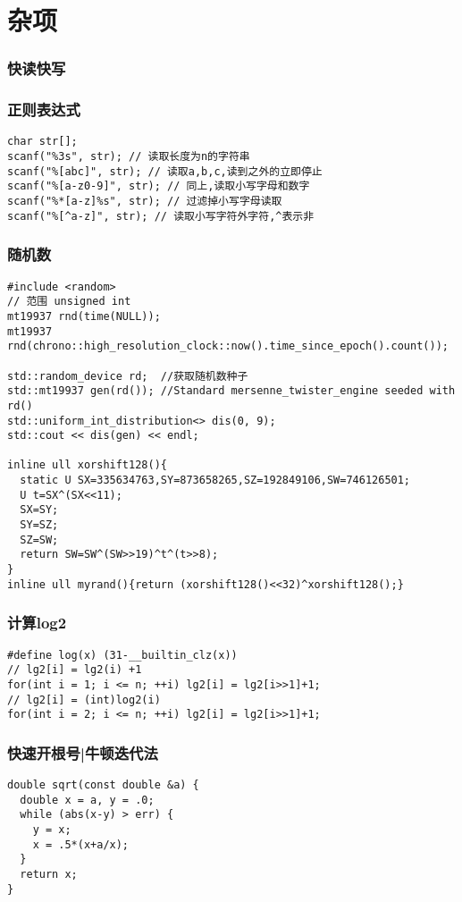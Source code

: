\documentclass[12pt]{article}
\begin{document}
     
\tableofcontents
\newpage

\part{杂项}
\section{ 快读快写}

\section{ 正则表达式}
{\setmainfont{Consolas}
\begin{lstlisting}
char str[];
scanf("%3s", str); // 读取长度为n的字符串
scanf("%[abc]", str); // 读取a,b,c,读到之外的立即停止
scanf("%[a-z0-9]", str); // 同上,读取小写字母和数字
scanf("%*[a-z]%s", str); // 过滤掉小写字母读取
scanf("%[^a-z]", str); // 读取小写字符外字符,^表示非 
\end{lstlisting}
\section{ 随机数}
{\setmainfont{Consolas}
\begin{lstlisting}
#include <random>
// 范围 unsigned int
mt19937 rnd(time(NULL));
mt19937 rnd(chrono::high_resolution_clock::now().time_since_epoch().count());

std::random_device rd;  //获取随机数种子
std::mt19937 gen(rd()); //Standard mersenne_twister_engine seeded with rd()
std::uniform_int_distribution<> dis(0, 9);
std::cout << dis(gen) << endl;

inline ull xorshift128(){
  static U SX=335634763,SY=873658265,SZ=192849106,SW=746126501;
  U t=SX^(SX<<11);
  SX=SY;
  SY=SZ;
  SZ=SW;
  return SW=SW^(SW>>19)^t^(t>>8);
}
inline ull myrand(){return (xorshift128()<<32)^xorshift128();}
\end{lstlisting}

\section{ 计算log2}
{\setmainfont{Consolas}
\begin{lstlisting}
#define log(x) (31-__builtin_clz(x))
// lg2[i] = lg2(i) +1
for(int i = 1; i <= n; ++i) lg2[i] = lg2[i>>1]+1;
// lg2[i] = (int)log2(i)
for(int i = 2; i <= n; ++i) lg2[i] = lg2[i>>1]+1;
\end{lstlisting}
\section{ 快速开根号|牛顿迭代法}
{\setmainfont{Consolas}
\begin{lstlisting}
double sqrt(const double &a) {
  double x = a, y = .0;
  while (abs(x-y) > err) {
    y = x;
    x = .5*(x+a/x);
  }
  return x;
}
\end{lstlisting}

}}}}
\end{document}
